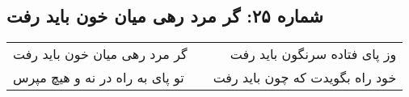 \begin{center}
\section*{شماره ۲۵: گر مرد رهی میان خون باید رفت}
\label{sec:025}
\begin{longtable}{l p{0.5cm} r}
گر مرد رهی میان خون باید رفت
&&
وز پای فتاده سرنگون باید رفت
\\
تو پای به راه در نه و هیچ مپرس
&&
خود راه بگویدت که چون باید رفت
\\
\end{longtable}
\end{center}
